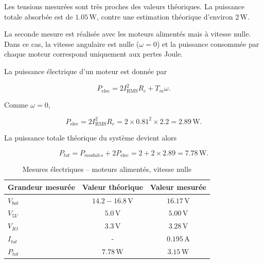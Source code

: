 Les tensions mesurées sont très proches des valeurs théoriques. La puissance totale absorbée est de $1.05\,\si{\watt}$, contre une estimation théorique d'environ $2\,\si{\watt}$.

\vspace{0.5cm}

La seconde mesure est réalisée avec les moteurs alimentés mais à vitesse nulle. Dans ce cas, la vitesse angulaire est nulle ($\omega=0$) et la puissance consommée par chaque moteur correspond uniquement aux pertes Joule.

La puissance électrique d'un moteur est donnée par

\begin{equation}
P_{\mathrm{elec}}
=
2I_{\mathrm{RMS}}^{2}R_c
+
T_m\omega.
\end{equation}

Comme $\omega=0$,

\begin{equation}
P_{\mathrm{elec}}
=
2I_{\mathrm{RMS}}^{2}R_c
=
2\times0.81^2\times2.2
=
2.89\,\si{\watt}.
\end{equation}

La puissance totale théorique du système devient alors

\begin{equation}
P_{tot}
=
P_{modules}
+
2P_{\mathrm{elec}}
=
2
+
2\times2.89
=
7.78\,\si{\watt}.
\end{equation}


\begin{table}[H]
    \centering
    \begin{tabular}{|l|c|c|}
        \hline
        \textbf{Grandeur mesurée} & \textbf{Valeur théorique} & \textbf{Valeur mesurée} \\
        \hline
        $V_{bat}$ & $14.2-16.8\,\si{\volt}$ & $16.17\,\si{\volt}$ \\
        \hline
        $V_{5V}$ & $5.0\,\si{\volt}$ & $5.00\,\si{\volt}$ \\
        \hline
        $V_{IO}$ & $3.3\,\si{\volt}$ & $3.28\,\si{\volt}$ \\
        \hline
        $I_{tot}$ & - & $0.195\,\si{\ampere}$ \\
        \hline
        $P_{tot}$ & $7.78\,\si{\watt}$ & $3.15\,\si{\watt}$ \\
        \hline
    \end{tabular}
    \caption{Mesures électriques -- moteurs alimentés, vitesse nulle}
    \label{tab:moteurs_allumes}
\end{table}

